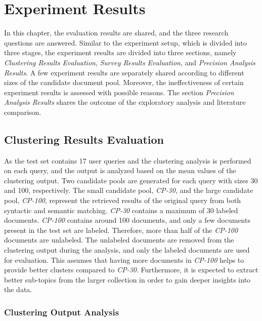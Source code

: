 
\chapter{Experiment Results}

In this chapter, the evaluation results are shared, and the three research questions are answered. Similar to the experiment setup, which is divided into three stages, the experiment results are divided into three sections, namely \textit{Clustering Results Evaluation}, \textit{Survey Results Evaluation}, and \textit{Precision Analysis Results}. A few experiment results are separately shared according to different sizes of the candidate document pool. Moreover, the ineffectiveness of certain experiment results is assessed with possible reasons. The section \textit{Precision Analysis Results} shares the outcome of the exploratory analysis and literature comparison.

\section{Clustering Results Evaluation}

As the test set contains 17 user queries and the clustering analysis is performed on each query, and the output is analyzed based on the mean values of the clustering output. Two candidate pools are generated for each query with sizes 30 and 100, respectively. The small candidate pool, \textit{CP-30}, and the large candidate pool, \textit{CP-100}, represent the retrieved results of the original query from both syntactic and semantic matching. \textit{CP-30} contains a maximum of 30 labeled documents. \textit{CP-100} contains around 100 documents, and only a few documents present in the test set are labeled. Therefore, more than half of the \textit{CP-100} documents are unlabeled. The unlabeled documents are removed from the clustering output during the analysis, and only the labeled documents are used for evaluation. This assumes that having more documents in \textit{CP-100} helps to provide better clusters compared to \textit{CP-30}. Furthermore, it is expected to extract better sub-topics from the larger collection in order to gain deeper insights into the data.

\subsection{Clustering Output Analysis}

